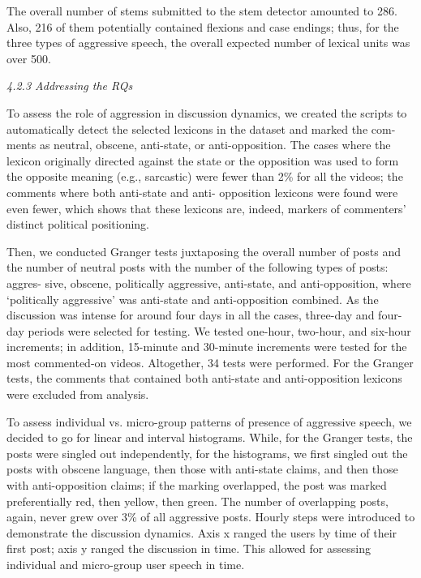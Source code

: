 The overall number of stems submitted to the stem detector amounted to 286. Also, 216 of them potentially contained flexions and case endings; thus, for the three types of aggressive speech, the overall expected number of lexical units was over 500.

\textit{4.2.3 Addressing the RQs}

To assess the role of aggression in discussion dynamics, we created the scripts to automatically detect the selected lexicons in the dataset and marked the com- ments as neutral, obscene, anti-state, or anti-opposition. The cases where the lexicon originally directed against the state or the opposition was used to form the opposite meaning (e.g., sarcastic) were fewer than 2\% for all the videos; the comments where both anti-state and anti- opposition lexicons were found were even fewer, which shows that these lexicons are, indeed, markers of commenters’ distinct political positioning.

Then, we conducted Granger tests juxtaposing the overall number of posts and the number of neutral posts with the number of the following types of posts: aggres- sive, obscene, politically aggressive, anti-state, and anti-opposition, where ‘politically aggressive’ was anti-state and anti-opposition combined. As the discussion was intense for around four days in all the cases, three-day and four-day periods were selected for testing. We tested one-hour, two-hour, and six-hour increments; in addition, 15-minute and 30-minute increments were tested for the most commented-on videos. Altogether, 34 tests were performed. For the Granger tests, the comments that contained both anti-state and anti-opposition lexicons were excluded from analysis.

To assess individual vs. micro-group patterns of presence of aggressive speech, we decided to go for linear and interval histograms. While, for the Granger tests, the posts were singled out independently, for the histograms, we first singled out the posts with obscene language, then those with anti-state claims, and then those with anti-opposition claims; if the marking overlapped, the post was marked preferentially red, then yellow, then green. The number of overlapping posts, again, never grew over 3\% of all aggressive posts. Hourly steps were introduced to demonstrate the discussion dynamics. Axis x ranged the users by time of their first post; axis y ranged the discussion in time. This allowed for assessing individual and micro-group user speech in time.

